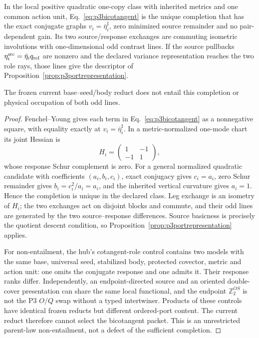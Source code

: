 \begin{proposition}
\label{prop:p3bicotangent}
In the local positive quadratic one-copy class with inherited metrics and one
common action unit, Eq.~\eqref{eq:p3bicotangent} is the unique completion that
has the exact conjugate graphs $v_i=\bar\eta_i^\sharp$, zero minimized source
remainder and no pair-dependent gain. Its two source/response exchanges are
commuting isometric involutions with one-dimensional odd contrast lines. If
the source pullbacks $\eta_i^{\rm src}=\bar\eta_iq_{\rm rel}$ are nonzero and
the declared variance representation reaches the two role rays, those lines
give the descriptor of Proposition~\ref{prop:p3portrepresentation}.

The frozen current base--seed/body reduct does not entail this completion or
physical occupation of both odd lines.
\end{proposition}

\begin{proof}
Fenchel--Young gives each term in Eq.~\eqref{eq:p3bicotangent} as a
nonnegative square, with equality exactly at $v_i=\bar\eta_i^\sharp$. In a
metric-normalized one-mode chart its joint Hessian is
\begin{equation}
 H_i=\begin{pmatrix}1&-1\\-1&1\end{pmatrix},
\end{equation}
whose response Schur complement is zero. For a general normalized quadratic
candidate with coefficients $(a_i,b_i,c_i)$, exact conjugacy gives
$c_i=a_i$, zero Schur remainder gives $b_i=c_i^2/a_i=a_i$, and the inherited
vertical curvature gives $a_i=1$. Hence the completion is unique in the
declared class. Leg exchange is an isometry of $H_i$; the two exchanges act
on disjoint blocks and commute, and their odd lines are generated by the two
source--response differences. Source basicness is precisely the quotient
descent condition, so Proposition~\ref{prop:p3portrepresentation} applies.

For non-entailment, the hub's cotangent-role control contains two models with
the same base, universal seed, stabilized body, protected covector, metric
and action unit: one omits the conjugate response and one admits it. Their
response ranks differ. Independently, an endpoint-directed source and an
oriented double-cover presentation can share the same local functional, and
the endpoint $\mathbb Z_2^{OS}$ is not the P3 $O/Q$ swap without a typed
intertwiner. Products of these controls have identical frozen reducts but
different ordered-port content. The current reduct therefore cannot select
the bicotangent packet. This is an unrestricted parent-law non-entailment, not a defect
of the sufficient completion.
\end{proof}

